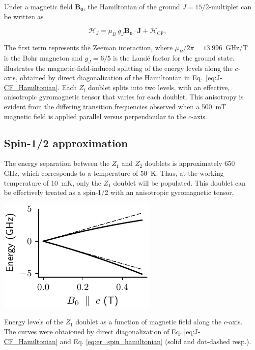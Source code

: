 Under a magnetic field $\mathbf{B_0}$, the Hamiltonian of the ground $J=15/2$-multiplet can be written as 

\begin{equation}
    \label{eq:J-CF_Hamiltonian}
    \mathcal{H}_J = \mu_B \ g_J\mathbf{B_0}\cdot \mathbf{J} + \mathcal{H}_{\mathrm{CF}},
\end{equation}

The first term represents the Zeeman interaction, where $\mu_B/2\pi = 13.996$~GHz/T is the Bohr magneton and $g_J = 6/5$ is the Landé factor for the \Er ground state.  illustrates the magnetic-field-induced splitting of the energy levels along the $c$-axis, obtained by direct diagonalization of the Hamiltonian in Eq.~\ref{eq:J-CF_Hamiltonian}. Each $Z_i$ doublet splits into two levels, with an effective, anisotropic gyromagnetic tensor that varies for each doublet. This anisotropy is evident from the differing transition frequencies observed when a 500~mT magnetic field is applied parallel versus perpendicular to the $c$-axis. 

\subsection{Spin-1/2 approximation}

The energy separation between the $Z_1$ and $Z_2$ doublets is approximately 650 GHz, which corresponds to a temperature of 50~K. Thus, at the working temperature of 10~mK, only the $Z_1$ doublet will be populated. This doublet can be effectively treated as a spin-1/2 with an anisotropic gyromagnetic tensor,

\begin{marginfigure}
    \includegraphics{chapter2/figures/energy_levels_vs_Bz_Z1.pdf}
    \caption[Zeeman splitting of the $Z_1$ doublet]{Energy levels of the $Z_1$ doublet as a function of magnetic field along the $c$-axis. The curves were obtaioned by direct diagonalization of Eq. \ref{eq:J-CF_Hamiltonian} and Eq. \ref{eq:er_spin_hamiltonian} (solid and dot-dashed resp.).}
\end{marginfigure}

